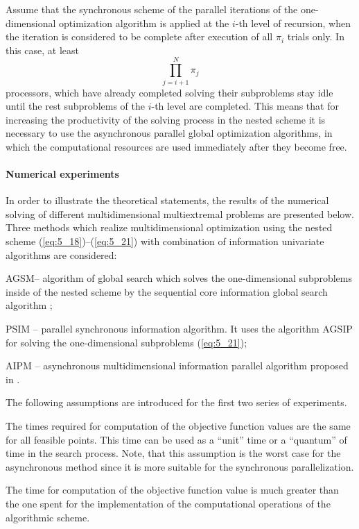 Assume that the synchronous scheme of the parallel iterations of the one-dimensional optimization algorithm is applied at the $i$-th level of recursion, when the iteration is considered to be complete after execution of all $\pi_i$   trials only. In this case, at least 
\begin{displaymath}
\prod_{j=i+1}^N{\pi_j}
\end{displaymath}
processors, which have already completed solving their subproblems stay idle until the rest subproblems of the $i$-th level are completed. This means that for increasing the productivity of the solving process in the nested scheme it is necessary to use the asynchronous parallel global optimization algorithms, in which the computational resources are used immediately after they become free.

\paragraph{Numerical experiments}

In order to illustrate the theoretical statements, the results of the numerical solving of different multidimensional multiextremal problems are presented below. Three methods which realize multidimensional optimization using the nested scheme (\ref{eq:5_18})--(\ref{eq:5_21}) with combination of information univariate algorithms are considered:
\begin{description} [1)]
\item [1)] {AGSM– algorithm of global search which solves the one-dimensional subproblems inside of the nested scheme by the sequential core information global search algorithm \cite{5_StrSergMon2000};}
\item [2)] {PSIM – parallel synchronous information algorithm. It uses the algorithm AGSIP \cite{5_GriKvaMukhStr} for solving the one-dimensional subproblems (\ref{eq:5_21});}
\item [3)] {AIPM – asynchronous multidimensional information parallel algorithm proposed in \cite{5_SergGriJCAA}.}
\end{description}

The following assumptions are introduced for the first two series of experiments.
\begin{description} [i)]
\item [i)] {The times required for computation of the objective function values are the same for all feasible points. This time can be used as a “unit” time or a “quantum” of time  in the search process. Note, that this assumption is the worst case for the asynchronous method since it is more suitable for the synchronous parallelization.}
\item [ii)] {The time for computation of the objective function value is much greater than the one spent for the implementation of the computational operations of the algorithmic scheme.}
\end{description}

